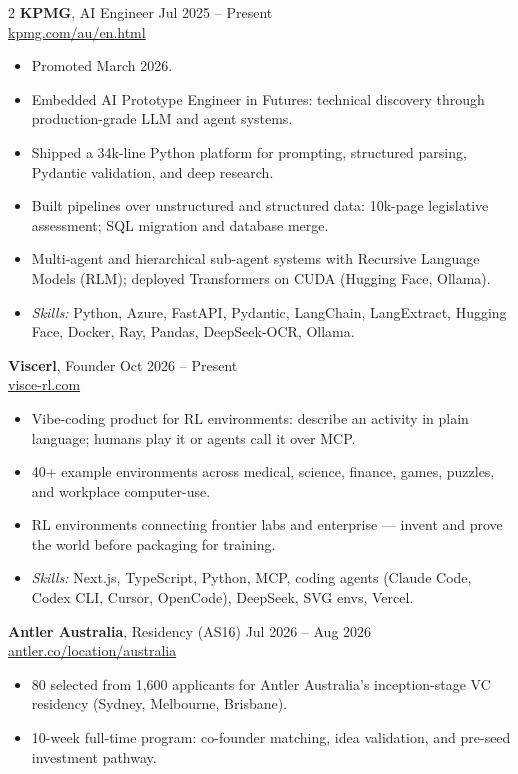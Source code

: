 \documentclass[10pt, a4paper]{article}
\begin{document}
\begin{multicols}{2}
\textbf{KPMG}, AI Engineer \hfill Jul 2025 -- Present \\
\href{https://kpmg.com/au/en.html}{kpmg.com/au/en.html}
\begin{itemize}
  \item Promoted March 2026.
  \item Embedded AI Prototype Engineer in Futures: technical discovery through production-grade LLM and agent systems.
  \item Shipped a 34k-line Python platform for prompting, structured parsing, Pydantic validation, and deep research.
  \item Built pipelines over unstructured and structured data: 10k-page legislative assessment; SQL migration and database merge.
  \item Multi-agent and hierarchical sub-agent systems with Recursive Language Models (RLM); deployed Transformers on CUDA (Hugging Face, Ollama).
  \item \textit{Skills:} Python, Azure, FastAPI, Pydantic, LangChain, LangExtract, Hugging Face, Docker, Ray, Pandas, DeepSeek-OCR, Ollama.
\end{itemize}

\textbf{Viscerl}, Founder \hfill Oct 2026 -- Present \\
\href{https://www.visce-rl.com/}{visce-rl.com}
\begin{itemize}
  \item Vibe-coding product for RL environments: describe an activity in plain language; humans play it or agents call it over MCP.
  \item 40+ example environments across medical, science, finance, games, puzzles, and workplace computer-use.
  \item RL environments connecting frontier labs and enterprise --- invent and prove the world before packaging for training.
  \item \textit{Skills:} Next.js, TypeScript, Python, MCP, coding agents (Claude Code, Codex CLI, Cursor, OpenCode), DeepSeek, SVG envs, Vercel.
\end{itemize}

\textbf{Antler Australia}, Residency (AS16) \hfill Jul 2026 -- Aug 2026 \\
\href{https://www.antler.co/location/australia}{antler.co/location/australia}
\begin{itemize}
  \item 80 selected from 1,600 applicants for Antler Australia's inception-stage VC residency (Sydney, Melbourne, Brisbane).
  \item 10-week full-time program: co-founder matching, idea validation, and pre-seed investment pathway.
\end{itemize}


\end{multicols}
\end{document}
